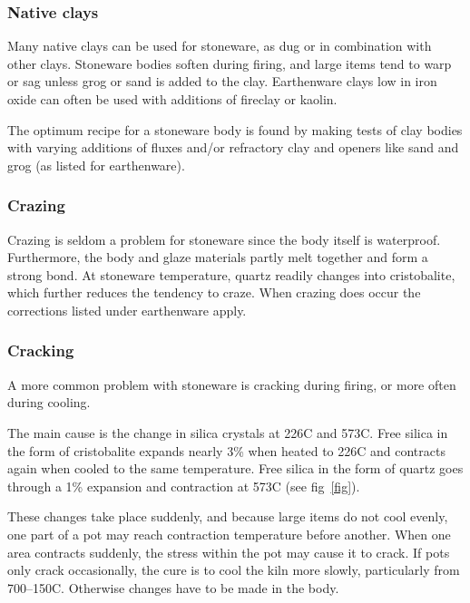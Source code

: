 \subsubsection{Native clays}
Many native clays can be used for stoneware, as dug or in combination with 
other clays. Stoneware bodies soften during firing, and large items tend to 
warp or sag unless grog or sand is added to the clay. Earthenware clays low in 
iron oxide can often be used with additions of fireclay or kaolin.

The optimum recipe for a stoneware body is found by making tests of clay bodies 
with varying additions of fluxes and/or refractory clay and openers like sand 
and grog (as listed for earthenware).
\subsubsection{Crazing}
Crazing is seldom a problem for stoneware since the body itself is waterproof. 
Furthermore, the body and glaze materials partly melt together and form a 
strong bond. At stoneware temperature, quartz readily changes into 
cristobalite, which further reduces the tendency to craze. When crazing does 
occur the corrections listed under earthenware apply.
\subsubsection{Cracking}
A more common problem with stoneware is cracking during firing, or more often 
during cooling. 

The main cause is the change in silica crystals at 226\degree C 
and 573\degree C. Free silica in the form of cristobalite expands nearly 3\% 
when heated to 226\degree C and contracts again when cooled to the same 
temperature. Free silica in the form of quartz goes through a 1\% expansion and 
contraction at 573\degree C (see fig~\ref{fig}). 

These changes take place suddenly, and because large items do not cool evenly, 
one part of a pot may reach contraction temperature before another. When one 
area contracts suddenly, the stress within the pot may cause it to crack. If 
pots only crack occasionally, the cure is to cool the kiln more slowly, 
particularly from 700\degree--150\degree C. Otherwise changes have to be made 
in 
the body.
